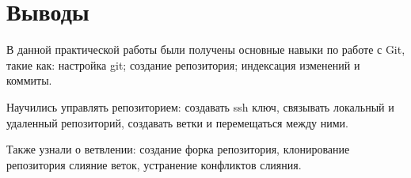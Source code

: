 \chapter*{Выводы}
В данной практической работы были получены основные навыки по работе с Git,
такие как: настройка git; создание репозитория; индексация изменений и коммиты.

Научились управлять репозиторием: создавать ssh ключ, связывать локальный и
удаленный репозиторий, создавать ветки и перемещаться между ними.

Также узнали о ветвлении: создание форка репозитория, клонирование репозитория
слияние веток, устранение конфликтов слияния.
